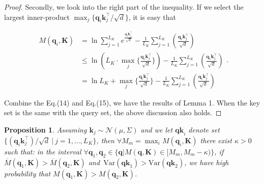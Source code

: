 \documentclass[letterpaper]{article} %
\newtheorem{proposition}{\textbf{Proposition}}
\newcommand{\mb}{\mathbf}
\begin{document}
\begin{appendices}
\begin{proof}
Secondly, we look into the right part of the inequality. If we select the largest inner-product $\max_{j}\{{\mb{q}_i \mb{k}_j^{\top}}/{\sqrt{d}}\}$, it is easy that

\begin{small}
\begin{equation}
\begin{aligned}
    M(\mb{q}_i, \mb{K}) &= \ln \sum_{j=1}^{L_K} e^{\frac{{\mb{q}_i\mb{k}_j^{\top}}}{{\sqrt{d}}}} \!-\!\frac{1}{L_K} \sum_{j=1}^{L_K} (\frac{{\mb{q}_i\mb{k}_j^{\top}}}{\sqrt{d}}) \\
    & \leq \ln ( L_K \!\cdot\! \max_{j}\{\frac{{\mb{q}_i \mb{k}_j^{\top}}}{\sqrt{d}}\} )\!-\!\frac{1}{L_K} \sum_{j=1}^{L_K} (\frac{\mb{q}_i\mb{k}_j^{\top}}{\sqrt{d}}) \\
    & = \ln L_K \!+\! \max_{j}\{\frac{\mb{q}_i \mb{k}_j^{\top}}{\sqrt{d}}\}\!-\!
    \frac{1}{L_K} \sum_{j=1}^{L_K} (\frac{\mb{q}_i\mb{k}_j^{\top}}{\sqrt{d}})
\end{aligned}.
\end{equation}
\end{small}

Combine the Eq.(14) and Eq.(15), we have the results of Lemma 1. When the key set is the same with the query set, the above discussion also holds.
\end{proof}

\begin{proposition}
Assuming $\mb{k}_j \sim \mathcal{N} (\mu, \Sigma)$ and we let $\mb{qk}_{i}$ denote set $\{({\mb{q}_i\mb{k}_j^{\top}})/{\sqrt{d}} ~|~ j=1,\ldots,L_K\}$, then $\forall M_{m} = \max_{i} M(\mb{q}_i, \mb{K})$ there exist $\kappa > 0$ such that: in the interval $\forall \mb{q}_1, \mb{q}_2 \in \{ \mb{q} | M(\mb{q}, \mb{K}) \in [ M_{m},  M_{m} - \kappa)\}$, if $\overline{M} (\mb{q}_1, \mb{K}) > \overline{M} (\mb{q}_2, \mb{K})$ and~$\mathrm{Var}(\mb{qk}_{1}) > \mathrm{Var}(\mb{qk}_{2})$, we have high probability that $M(\mb{q}_1, \mb{K}) > M(\mb{q}_2, \mb{K})$.
\end{proposition}


\end{appendices}
\end{document}
